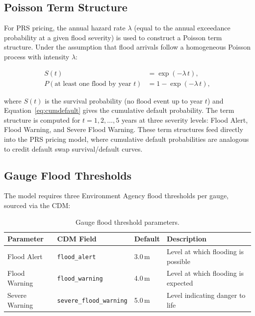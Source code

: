 \documentclass[11pt,a4paper]{article}
\begin{document}
\subsection{Poisson Term Structure}

For PRS pricing, the annual hazard rate $\lambda$ (equal to the annual exceedance probability at a given flood severity) is used to construct a Poisson term structure. Under the assumption that flood arrivals follow a homogeneous Poisson process with intensity $\lambda$:

\begin{align}
S(t) &= \exp(-\lambda\, t), \label{eq:survival} \\[6pt]
P(\text{at least one flood by year } t) &= 1 - \exp(-\lambda\, t), \label{eq:cumdefault}
\end{align}

\noindent where $S(t)$ is the survival probability (no flood event up to year $t$) and Equation~\eqref{eq:cumdefault} gives the cumulative default probability. The term structure is computed for $t = 1, 2, \ldots, 5$ years at three severity levels: Flood Alert, Flood Warning, and Severe Flood Warning. These term structures feed directly into the PRS pricing model, where cumulative default probabilities are analogous to credit default swap survival/default curves.

\clearpage

\mkminputs

\subsection{Gauge Flood Thresholds}

The model requires three Environment Agency flood thresholds per gauge, sourced via the CDM:

\begin{table}[H]
\centering
\caption{Gauge flood threshold parameters.}
\label{tab:gauge_thresholds}
\begin{tabular}{llll}
\toprule
\textbf{Parameter} & \textbf{CDM Field} & \textbf{Default} & \textbf{Description} \\
\midrule
Flood Alert       & \texttt{flood\_alert}           & 3.0\,m & Level at which flooding is possible \\
Flood Warning     & \texttt{flood\_warning}          & 4.0\,m & Level at which flooding is expected \\
Severe Warning    & \texttt{severe\_flood\_warning}  & 5.0\,m & Level indicating danger to life \\
\bottomrule
\end{tabular}
\end{table}
\end{document}
